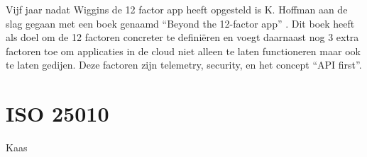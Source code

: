 Vijf jaar nadat Wiggins de 12 factor app heeft opgesteld is K. Hoffman aan de slag gegaan met een boek genaamd \enquote{Beyond the 12-factor app} \parencite{Beyond12Factor}. Dit boek heeft als doel om de 12 factoren concreter te definiëren en voegt daarnaast nog 3 extra factoren toe om applicaties in de cloud niet alleen te laten functioneren maar ook te laten gedijen. Deze factoren zijn telemetry, security, en het concept \enquote{API first}.

\section{ISO 25010}

Kaas